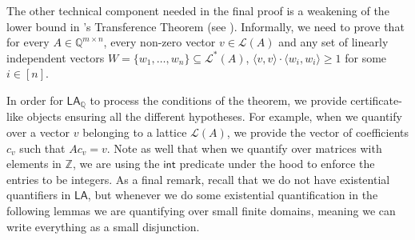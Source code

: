 \documentclass[11pt]{article}
\newcommand{\LA}{\mathsf{LA}}
\newcommand{\LAQ}{\mathsf{LA}_\mathbb{Q}}
\theoremstyle{definition}
\theoremstyle{plain}
\theoremstyle{remark}
\newcommand{\LL}{\mathcal{L}}
\newcommand{\bZ}{\mathbb{Z}}
\begin{document}
The other technical component needed in the final proof is a weakening of the lower bound in \citeauthor{banaszczyk1993new}'s Transference Theorem (see ). Informally, we need to prove that for every $A\in\mathbb{Q}^{m\times n}$, every non-zero vector $v\in\mathcal{L}(A)$ and any set of linearly independent vectors $W = \{w_1, \dots, w_n\} \subseteq \mathcal{L}^*(A)$, $\langle v ,v\rangle\cdot \langle w_i,w_i\rangle\geq 1$ for some $i \in [n]$.

In order for $\LAQ$ to process the conditions of the theorem, we provide certificate-like objects ensuring all the different hypotheses. For example, when we quantify over a vector $v$ belonging to a lattice $\LL(A)$, we provide the vector of coefficients $c_v$ such that $Ac_v = v$. Note as well that when we quantify over matrices with elements in $\bZ$, we are using the $\mathsf{int}$ predicate under the hood to enforce the entries to be integers. As a final remark, recall that we do not have existential quantifiers in $\LA$, but whenever we do some existential quantification in the following lemmas we are quantifying over small finite domains, meaning we can write everything as a small disjunction.
\end{document}
